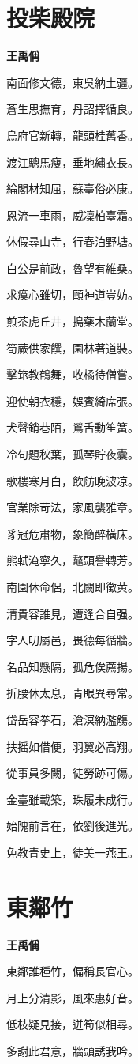 \documentclass[12pt,a4paper]{ctexbook}
\begin{document}
\section{投柴殿院}
\textbf{王禹偁}\par\vspace{0.5em}
南面修文德，東吳納土疆。\par
蒼生思撫育，丹詔擇循良。\par
烏府官新轉，龍頭桂舊香。\par
渡江驄馬瘦，垂地繡衣長。\par
綸閣材知屈，蘇臺俗必康。\par
恩流一車雨，威凜柏臺霜。\par
休假尋山寺，行春泊野塘。\par
白公是前政，魯望有維桑。\par
求瘼心雖切，頤神道豈妨。\par
煎茶虎丘井，搗藥木蘭堂。\par
筍蕨供家饌，園林著道裝。\par
擊筇教鶴舞，收橘待僧嘗。\par
迎使朝衣穩，娛賓綺席張。\par
犬聲銷巷陌，鶑舌動笙簧。\par
冷句題秋葉，孤琴貯夜囊。\par
歌樓寒月白，飲舫晚波凉。\par
官業除苛法，家風襲雅章。\par
豸冠危肅物，象簡醉橫床。\par
熊軾淹寧久，鼇頭譽轉芳。\par
南園休命侶，北闕即徵黄。\par
清貴容誰見，遭逢合自强。\par
字人叨屬邑，畏德每循牆。\par
名品知懸隔，孤危俟薦揚。\par
折腰休太息，青眼異尋常。\par
岱岳容拳石，滄溟納濫觴。\par
扶摇如借便，羽翼必高翔。\par
從事員多闕，徒勞跡可傷。\par
金臺雖載築，珠履未成行。\par
始隗前言在，依劉後進光。\par
免教青史上，徒美一燕王。\par

\section{東鄰竹}
\textbf{王禹偁}\par\vspace{0.5em}
東鄰誰種竹，偏稱長官心。\par
月上分清影，風來惠好音。\par
低枝疑見接，迸筍似相尋。\par
多謝此君意，牆頭誘我吟。\par
\end{document}
